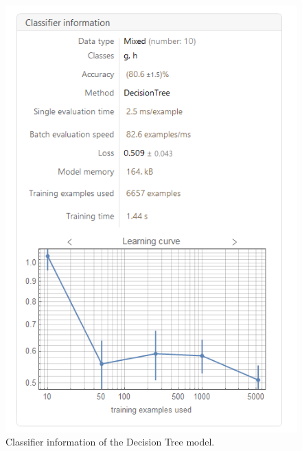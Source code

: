 \documentclass[a4paper, 12pt]{report}
\theoremstyle{definition}
\begin{document}
\begin{figure}[p]
  \centering
  \includegraphics[scale=0.75]{models/dt1.png}
  \caption{Classifier information of the Decision Tree model.}
\end{figure}
\end{document}
